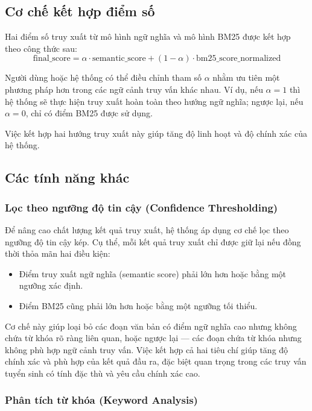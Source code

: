 \subsection{Cơ chế kết hợp điểm số}

Hai điểm số truy xuất từ mô hình ngữ nghĩa và mô hình BM25 được kết hợp theo công thức sau:
\[
    \text{final\_score} = \alpha \cdot \text{semantic\_score} + (1 - \alpha) \cdot \text{bm25\_score\_normalized}
\]

Người dùng hoặc hệ thống có thể điều chỉnh tham số \(\alpha\) nhằm ưu tiên một phương pháp hơn trong các ngữ cảnh truy vấn khác nhau. Ví dụ, nếu \(\alpha = 1\) thì hệ thống sẽ thực hiện truy xuất hoàn toàn theo hướng ngữ nghĩa; ngược lại, nếu \(\alpha = 0\), chỉ có điểm BM25 được sử dụng.

Việc kết hợp hai hướng truy xuất này giúp tăng độ linh hoạt và độ chính xác của hệ thống.

\subsection{Các tính năng khác}

\subsubsection{Lọc theo ngưỡng độ tin cậy (Confidence Thresholding)}

Để nâng cao chất lượng kết quả truy xuất, hệ thống áp dụng cơ chế lọc theo ngưỡng độ tin cậy kép. Cụ thể, mỗi kết quả truy xuất chỉ được giữ lại nếu đồng thời thỏa mãn hai điều kiện:

\begin{itemize}
    \item Điểm truy xuất ngữ nghĩa (semantic score) phải lớn hơn hoặc bằng một ngưỡng xác định.
    \item Điểm BM25 cũng phải lớn hơn hoặc bằng một ngưỡng tối thiểu.
\end{itemize}

Cơ chế này giúp loại bỏ các đoạn văn bản có điểm ngữ nghĩa cao nhưng không chứa từ khóa rõ ràng liên quan, hoặc ngược lại — các đoạn chứa từ khóa nhưng không phù hợp ngữ cảnh truy vấn. Việc kết hợp cả hai tiêu chí giúp tăng độ chính xác và phù hợp của kết quả đầu ra, đặc biệt quan trọng trong các truy vấn tuyển sinh có tính đặc thù và yêu cầu chính xác cao.

\subsubsection{Phân tích từ khóa (Keyword Analysis)}

